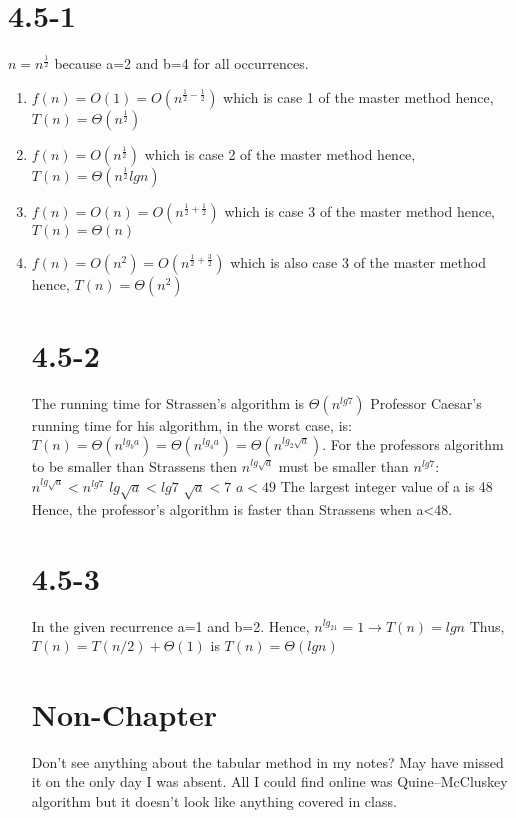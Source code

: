 \documentclass[12pt]{article}
\begin{document}
\section{4.5-1}
$n=n^{\frac{1}{2}}$ because a=2 and b=4 for all occurrences. \newline
\begin{enumerate}
\item $f(n)=O(1)=O(n^{\frac{1}{2}-\frac{1}{2}})$ which is case 1 of the master method hence, $T(n)=\Theta(n^{\frac{1}{2}})$
\item $f(n)=O(n^{\frac{1}{2}})$ which is case 2 of the master method hence, $T(n)=\Theta(n^{\frac{1}{2}}lgn)$
\item $f(n)=O(n)=O(n^{\frac{1}{2}+\frac{1}{2}})$ which is case 3 of the master method hence, $T(n)=\Theta(n)$
\item $f(n)=O(n^2)=O(n^{\frac{1}{2}+\frac{3}{2}})$ which is also case 3 of the master method hence, $T(n)=\Theta(n^2)$

\section{4.5-2}
The running time for Strassen's algorithm is $\Theta(n^{lg7})$ Professor Caesar's running time for his algorithm, in the worst case, is: $T(n)=\Theta(n^{lg_ba})=\Theta(n^{lg_4a})=\Theta(n^{lg_2\sqrt{a}})$. \newline
For the professors algorithm to be smaller than Strassens then $n^{lg\sqrt{a}}$ must be smaller than $n^{lg7}$: \newline
$n^{lg\sqrt{a}}<n^{lg7}$ \newline
$lg\sqrt{a}<lg7$ \newline
$\sqrt{a}<7$ \newline
$a<49$ The largest integer value of a is 48 \newline
Hence, the professor's algorithm is faster than Strassens when a<48.

\section{4.5-3}
In the given recurrence a=1 and b=2. Hence, $n^{lg_21}=1 \rightarrow T(n)=lgn$ Thus, $T(n)=T(n/2)+\Theta(1)$ is $T(n)=\Theta(lgn)$

\section{Non-Chapter}
Don't see anything about the tabular method in my notes? May have missed it on the only day I was absent. All I could find online was Quine–McCluskey algorithm but it doesn't look like anything covered in class. 

\end{enumerate}
\end{document}
